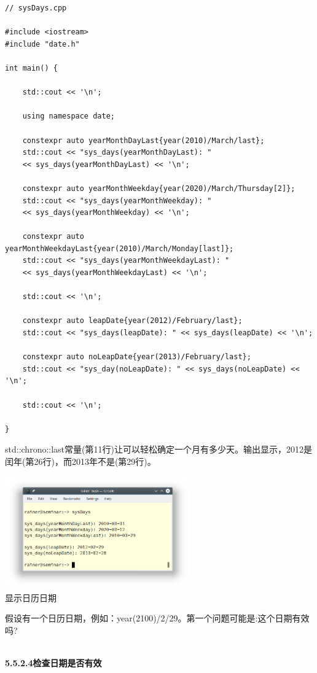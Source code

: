 \begin{lstlisting}[style=styleCXX]
 // sysDays.cpp

#include <iostream>
#include "date.h"

int main() {

	std::cout << '\n';
	
	using namespace date;
	
	constexpr auto yearMonthDayLast{year(2010)/March/last};
	std::cout << "sys_days(yearMonthDayLast): "
	<< sys_days(yearMonthDayLast) << '\n';
	
	constexpr auto yearMonthWeekday{year(2020)/March/Thursday[2]};
	std::cout << "sys_days(yearMonthWeekday): "
	<< sys_days(yearMonthWeekday) << '\n';
	
	constexpr auto yearMonthWeekdayLast{year(2010)/March/Monday[last]};
	std::cout << "sys_days(yearMonthWeekdayLast): "
	<< sys_days(yearMonthWeekdayLast) << '\n';
	
	std::cout << '\n';
	
	constexpr auto leapDate{year(2012)/February/last};
	std::cout << "sys_days(leapDate): " << sys_days(leapDate) << '\n';
	
	constexpr auto noLeapDate{year(2013)/February/last};
	std::cout << "sys_day(noLeapDate): " << sys_days(noLeapDate) << '\n';
	
	std::cout << '\n';

}
\end{lstlisting}

std::chrono::last常量(第11行)让可以轻松确定一个月有多少天。输出显示，2012是闰年(第26行)，而2013年不是(第29行)。

\begin{center}
\includegraphics[width=0.6\textwidth]{content/3/chapter5/images/22.png}\\
显示日历日期
\end{center}

假设有一个日历日期，例如：year(2100)/2/29。第一个问题可能是:这个日期有效吗?

\hspace*{\fill} \\ %
\noindent
\textbf{5.5.2.4\hspace{0.2cm}检查日期是否有效}


